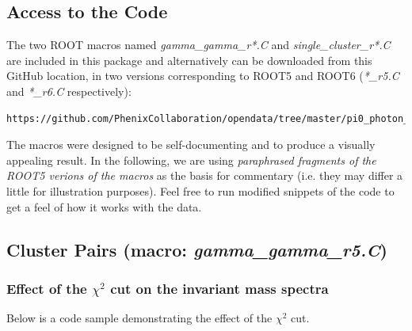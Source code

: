 \documentclass[pdftex,12pt,letter]{article}
\begin{document}
\subsection{Access to the Code}
The two ROOT macros named \textit{gamma\_gamma\_r*.C} and
\textit{single\_cluster\_r*.C} are included in this package and alternatively
can be downloaded from this GitHub location,
in two versions corresponding to ROOT5 and ROOT6 (\textit{*\_r5.C} and
\textit{*\_r6.C} respectively):
\begin{verbatim}
https://github.com/PhenixCollaboration/opendata/tree/master/pi0_photon_analysis
\end{verbatim}
\noindent
The macros were designed to be self-documenting and to produce a visually appealing
result.
In the following, we are using {\it paraphrased fragments of the ROOT5 verions of the macros}
as the basis
for commentary (i.e. they may differ a little for illustration purposes). Feel free to
run modified snippets of the code to get a feel of how it works with the data.

\subsection{Cluster Pairs (macro: \textit{gamma\_gamma\_r5.C})}
\subsubsection{Effect of the $\chi^2$ cut on the invariant mass spectra}
Below is a code sample demonstrating the effect of the $\chi^2$ cut.
\end{document}

